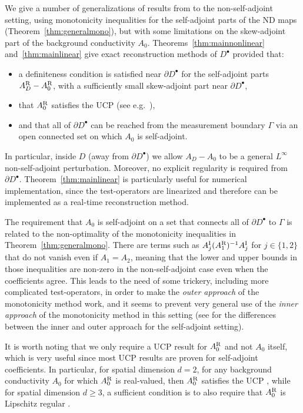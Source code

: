 \documentclass[reqno]{amsart}
\numberwithin{equation}{section}
\numberwithin{figure}{section}
\numberwithin{table}{section}
\theoremstyle{plain}
\theoremstyle{definition}
\theoremstyle{remark}
\newcommand{\upR}{^{\textup{R}}}
\newcommand{\upI}{^{\textup{I}}}
\newcommand{\AR}{A\upR}
\newcommand{\AI}{A\upI}
\begin{document}
	We give a number of generalizations of results from \cite{GJZ2025} to the non-self-adjoint setting, using monotonicity inequalities for the self-adjoint parts of the ND maps (Theorem~\ref{thm:generalmono}), but with some limitations on the skew-adjoint part of the background conductivity $A_0$. Theorems~\ref{thm:mainnonlinear} and~\ref{thm:mainlinear} give exact reconstruction methods of $D^\bullet$ provided that: 
	\begin{itemize}
		\item a definiteness condition is satisfied near $\partial D^\bullet$ for the self-adjoint parts $\AR_D-\AR_0$, with a sufficiently small skew-adjoint part near $\partial D^\bullet$,
		\item that $\AR_0$ satisfies the UCP (see e.g.~\cite[definition 3.2]{GJZ2025}),
		\item and that all of $\partial D^\bullet$ can be reached from the measurement boundary $\Gamma$ via an open connected set on which $A_0$ is self-adjoint.
	\end{itemize}   
	In particular, inside $D$ (away from $\partial D^\bullet$) we allow $A_D - A_0$ to be a general $L^\infty$ non-self-adjoint perturbation. Moreover, no explicit regularity is required from $\partial D^\bullet$. Theorem~\ref{thm:mainlinear} is particularly useful for numerical implementation, since the test-operators are linearized and therefore can be implemented as a real-time reconstruction method.
	
	The requirement that $A_0$ is self-adjoint on a set that connects all of $\partial D^\bullet$ to $\Gamma$ is related to the non-optimality of the monotonicity inequalities in Theorem~\ref{thm:generalmono}. There are terms such as $\AI_j(\AR_1)^{-1}\AI_j$ for $j\in\{1,2\}$ that do not vanish even if $A_1=A_2$, meaning that the lower and upper bounds in those inequalities are non-zero in the non-self-adjoint case even when the coefficients agree. This leads to the need of some trickery, including more complicated test-operators, in order to make the \emph{outer approach} of the monotonicity method work, and it seems to prevent very general use of the \emph{inner approach} of the monotonicity method in this setting (see \cite{GJZ2025} for the differences between the inner and outer approach for the self-adjoint setting). 
	
	It is worth noting that we only require a UCP result for $\AR_0$ and not $A_0$ itself, which is very useful since most UCP results are proven for self-adjoint coefficients. In particular, for spatial dimension $d=2$, for any background conductivity $A_0$ for which $\AR_0$ is real-valued, then $\AR_0$ satisfies the UCP \cite{Alessandrini2012}, while for spatial dimension $d\geq 3$, a sufficient condition is to also require that $\AR_0$ is Lipschitz regular \cite{Garofalo1986,Mandache1998,Miller74}. 
	
\end{document}
